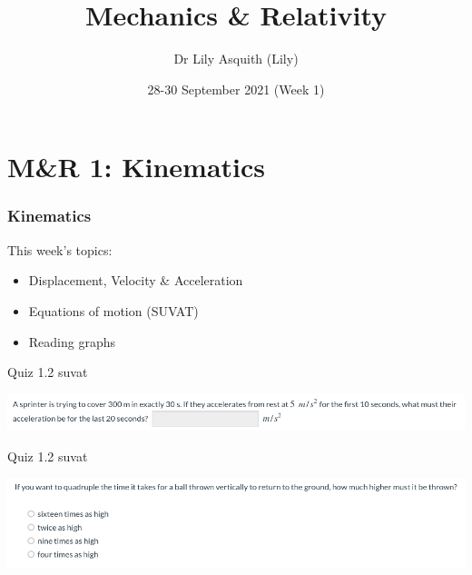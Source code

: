 


% 
\title[ Mechanics \& Relativity]{Mechanics \& Relativity}
\author[Dr Lily Asquith (Lily)]{ Dr Lily Asquith (Lily)}
\date[28-30 September 2021]{28-30 September 2021 (Week 1)}





\begin{frame}
\titlepage
\end{frame} 

\section{M\&R 1: Kinematics}
\begin{frame}
\frametitle{Kinematics} 
\normalsize

This week's topics:\\[3ex]

\begin{itemize}
\item[1.1] Displacement, Velocity \& Acceleration\\[3ex]
\item[1.2] Equations of motion (SUVAT)\\[3ex]
\item[1.3] Reading graphs\\[3ex]
\end{itemize}
\end{frame} 
 
\begin{frame}{Quiz 1.2 suvat}

\includegraphics[scale=0.35]{suvat-quiz}
\vspace{6cm}
\end{frame}

\begin{frame}{Quiz 1.2 suvat}

\includegraphics[scale=0.35]{ball-height}
\vspace{6cm}
\end{frame}


